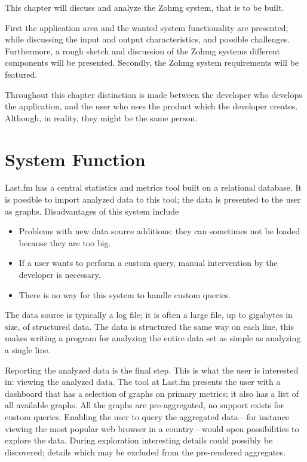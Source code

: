 This chapter will discuss and analyze the Zohmg system, that is to be built.

First the application area and the wanted system functionality are presented;
while discussing the input and output characteristics, and possible challenges.
Furthermore, a rough sketch and discussion of the Zohmg systems different
components will be presented. Secondly, the Zohmg system requirements will be
featured.

Throughout this chapter distinction is made between the developer who develops
the application, and the user who uses the product which the developer
creates. Although, in reality, they might be the same person.


\section{System Function}

Last.fm has a central statistics and metrics tool built on a relational
database. It is possible to import analyzed data to this tool; the data is
presented to the user as graphs. Disadvantages of this system include
\begin{itemize}
\item Problems with new data source additions: they can sometimes not be loaded
because they are too big.
\item If a user wants to perform a custom query, manual intervention by the
developer is necessary.
\item There is no way for this system to handle custom queries.
\end{itemize}

The data source is typically a log file; it is often a large file, up to
gigabytes in size, of structured data. The data is structured the same way on
each line, this makes writing a program for analyzing the entire data set as
simple as analyzing a single line.

Reporting the analyzed data is the final step. This is what the user is
interested in: viewing the analyzed data. The tool at Last.fm presents the user
with a dashboard that has a selection of graphs on primary metrics; it also has
a list of all available graphs. All the graphs are pre-aggregated, no support
exists for custom queries. Enabling the user to query the aggregated data---for
instance viewing the most popular web browser in a country---would open
possibilities to explore the data. During exploration interesting details could
possibly be discovered; details which may be excluded from the pre-rendered
aggregates.

